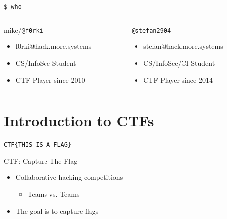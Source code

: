 {
\begin{frame}[t,plain]
    \titlepage
\end{frame}
}

\begin{frame}
  {\texttt{\$ who}}

  \begin{columns}
    \begin{column}{0.48\textwidth}
      {mike/\texttt{@f0rki}}
      \begin{itemize}
        \item f0rki@hack.more.systems
        \item CS/InfoSec Student
        \item CTF Player since 2010
      \end{itemize}
    \end{column}

    \begin{column}{0.48\textwidth}
      \texttt{@stefan2904}
      \begin{itemize}
        \item stefan@hack.more.systems
        \item CS/InfoSec/CI Student
        \item CTF Player since 2014
      \end{itemize}
    \end{column}
  \end{columns}

\end{frame}




\section{Introduction to CTFs}

\begin{frame}
	 \begin{center}
	 	\Huge\verb+CTF{THIS_IS_A_FLAG}+
	 \end{center}
\end{frame}

\begin{frame}[fragile]
  {CTF: Capture The Flag}

  \begin{itemize}
    \item Collaborative hacking competitions
    \begin{itemize}
    	\item Teams vs. Teams
    \end{itemize}
    \item The goal is to capture flags
  \end{itemize}
\end{frame}

